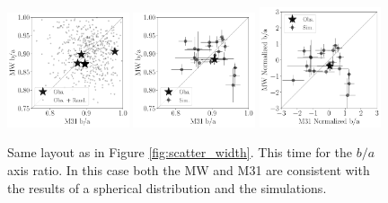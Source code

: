\documentclass[a4paper,fleqn,usenatbib]{mnras}
\begin{document}
\begin{figure}
\centering
\includegraphics[width=0.32\textwidth]{scatter_random_ranked_ba_ratio.pdf}
\includegraphics[width=0.32\textwidth]{scatter_ranked_ba_ratio.pdf}
\includegraphics[width=0.32\textwidth]{scatter_norm_ba_ratio.pdf}
\caption{Same layout as in Figure \ref{fig:scatter_width}. 
This time for the $b/a$ axis ratio. In this case both the MW and M31
are consistent with the results of a spherical distribution and the
simulations. 
\label{fig:scatter_ba_ration}}
\end{figure}
\end{document}
